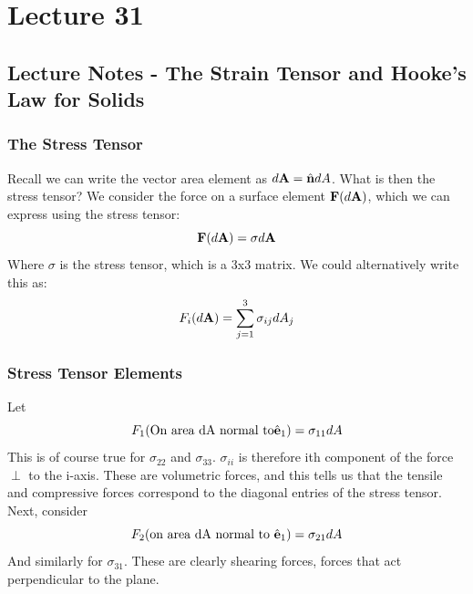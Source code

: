 \section{Lecture 31}
\subsection{Lecture Notes - The Strain Tensor and Hooke's Law for Solids}
\subsubsection{The Stress Tensor}
Recall we can write the vector area element as $d\mathbf{A} = \hat{\mathbf{n}}dA$. What is then the stress tensor? We consider the force on a surface element $\mathbf{F}(d\mathbf{A})$, which we can express using the stress tensor:
\[\mathbf{F}(d\mathbf{A}) = \sigma d\mathbf{A}\]
Where $\sigma$ is the stress tensor, which is a 3x3 matrix. We could alternatively write this as:
\[F_i(d\mathbf{A}) = \sum_{j=1}^3 \sigma_{ij}dA_j\]

\subsubsection{Stress Tensor Elements}
Let
\[F_1(\text{On area dA normal to} \hat{\mathbf{e}}_1) = \sigma_{11}dA\]
This is of course true for $\sigma_{22}$ and $\sigma_{33}$. $\sigma_{ii}$ is therefore ith component of the force $\perp$ to the i-axis. These are volumetric forces, and this tells us that the tensile and compressive forces correspond to the diagonal entries of the stress tensor. Next, consider \[F_2(\text{on area dA normal to } \hat{\mathbf{e}}_1) = \sigma_{21}dA\]
And similarly for $\sigma_{31}$. These are clearly shearing forces, forces that act perpendicular to the plane.

